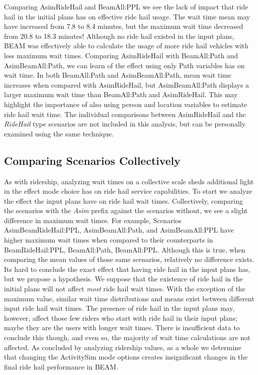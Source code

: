 \documentclass[fancy, masters]{byuthesis}
\begin{document}
Comparing AsimRideHail and BeamAll:PPL we see the lack of impact that ride hail in the initial plans has on effective ride hail usage. The wait time mean may have increased from 7.8 to 8.4 minutes, but the maximum wait time decreased from 20.8 to 18.3 minutes! Although no ride hail existed in the input plans, BEAM was effectively able to calculate the usage of more ride hail vehicles with less maximum wait times. Comparing AsimRideHail with BeamAll:Path and AsimBeamAll:Path, we can learn of the effect using only Path variables has on wait time. In both BeamAll:Path and AsimBeamAll:Path, mean wait time increases when compared with AsimRideHail, but AsimBeamAll:Path displays a larger maximum wait time than BeamAll:Path and AsimRideHail. This may highlight the importance of also using person and location variables to estimate ride hail wait time. The individual comparisons between AsimRideHail and the \emph{RideHail} type scenarios are not included in this analysis, but can be personally examined using the same technique.

\hypertarget{comparing-scenarios-collectively}{%
\subsection{Comparing Scenarios Collectively}\label{comparing-scenarios-collectively}}

As with ridership, analyzing wait times on a collective scale sheds additional light in the effect mode choice has on ride hail service capabilities. To start we analyze the effect the input plans have on ride hail wait times. Collectively, comparing the scenarios with the \emph{Asim} prefix against the scenarios without, we see a slight difference in maximum wait times. For example, Scenarios AsimBeamRideHail:PPL, AsimBeamAll:Path, and AsimBeamAll:PPL have higher maximum wait times when compared to their counterparts in BeamRideHail:PPL, BeamAll:Path, BeamAll:PPL. Although this is true, when comparing the mean values of those same scenarios, relatively no difference exists. Its hard to conclude the exact effect that having ride hail in the input plans has, but we propose a hypothesis. We suppose that the existence of ride hail in the initial plans will not affect \emph{most} ride hail wait times. With the exception of the maximum value, similar wait time distributions and means exist between different input ride hail wait times. The presence of ride hail in the input plans may, however, affect those few riders who start with ride hail in their input plans; maybe they are the users with longer wait times. There is insufficient data to conclude this though, and even so, the majority of wait time calculations are not affected. As concluded by analyzing ridership values, as a whole we determine that changing the ActivitySim mode options creates insignificant changes in the final ride hail performance in BEAM.
\end{document}
